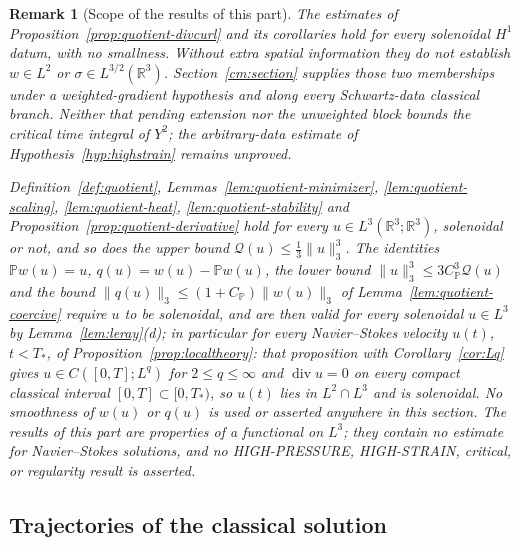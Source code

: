 \documentclass[11pt]{article}
\newtheorem{remark}[theorem]{Remark}
\theoremstyle{definition}
\theoremstyle{plain}
\newcommand{\R}{\mathbb R}
\newcommand{\norm}[1]{\lVert #1\rVert}
\begin{document}
\begin{remark}[Scope of the results of this part]\label{rem:quotient-scope}
The estimates of Proposition~\ref{prop:quotient-divcurl} and its corollaries
hold for every solenoidal $H^1$ datum, with no smallness. Without extra
spatial information they do not establish $w\in L^2$ or
$\sigma\in L^{3/2}(\R^3)$. Section~\ref{cm:section} supplies those two
memberships under a weighted-gradient hypothesis and along every
Schwartz-data classical branch. Neither that pending extension nor the
unweighted block bounds the critical time integral of $Y^2$; the
arbitrary-data estimate of Hypothesis~\ref{hyp:highstrain} remains unproved.

Definition~\ref{def:quotient}, Lemmas~\ref{lem:quotient-minimizer},
\ref{lem:quotient-scaling}, \ref{lem:quotient-heat},
\ref{lem:quotient-stability} and
Proposition~\ref{prop:quotient-derivative} hold for every
$u\in L^3(\R^3;\R^3)$, solenoidal or not, and so does the upper bound
$\mathcal Q(u)\le\frac13\norm u_3^3$.  The identities $\mathbb Pw(u)=u$,
$q(u)=w(u)-\mathbb Pw(u)$, the lower bound
$\norm u_3^3\le3C_{\mathbb P}^3\mathcal Q(u)$ and the bound
$\norm{q(u)}_3\le(1+C_{\mathbb P})\norm{w(u)}_3$ of
Lemma~\ref{lem:quotient-coercive} require $u$ to be solenoidal, and are
then valid for every solenoidal $u\in L^3$ by Lemma~\ref{lem:leray}(d);
in particular for every Navier--Stokes velocity $u(t)$, $t<T_*$, of
Proposition~\ref{prop:localtheory}: that proposition with
Corollary~\ref{cor:Lq} gives
$u\in C([0,T];L^q)$ for $2\le q\le\infty$ and $\operatorname{div}u=0$ on
every compact classical interval $[0,T]\subset[0,T_*)$, so $u(t)$ lies in
$L^2\cap L^3$ and is solenoidal.  No smoothness of $w(u)$ or $q(u)$ is
used or asserted anywhere in this section.  The results of this part are properties of a
functional on $L^3$; they contain no estimate for Navier--Stokes
solutions, and no HIGH-PRESSURE, HIGH-STRAIN, critical, or regularity
result is asserted.
\end{remark}


\subsection{Trajectories of the classical solution}
\label{subsec:qe-trajectories}
\end{document}

